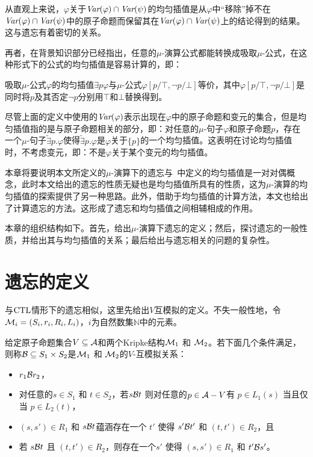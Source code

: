 从直观上来说，$\varphi$关于$\textit{Var}(\varphi) \cap \textit{Var}(\psi)$的均匀插值是从$\varphi$中“移除”掉不在$\textit{Var}(\varphi) \cap \textit{Var}(\psi)$中的原子命题而保留其在$\textit{Var}(\varphi) \cap \textit{Var}(\psi)$上的结论得到的结果。这与遗忘有着密切的关系。

再者，在背景知识部分已经指出，任意的$\mu$-演算公式都能转换成吸取$\mu$-公式，在这种形式下的公式的均匀插值是容易计算的，即：
\begin{theorem}
	吸取$\mu$-公式$\varphi$的均匀插值$\exists p \varphi$与$\mu$-公式$\varphi[p/\top, \neg p/ \bot]$等价，其中$\varphi[p/\top, \neg p/ \bot]$是同时将$p$及其否定$\neg p$分别用$\top$和$\bot$替换得到。
\end{theorem}



尽管上面的定义中使用的$\textit{Var}(\varphi)$表示出现在$\varphi$中的原子命题和变元的集合，但是均匀插值指的是与原子命题相关的部分，即：对任意的$\mu$-句子$\varphi$和原子命题$p$，存在一个$\mu$-句子$\widetilde{\exists} p. \varphi$使得$\widetilde{\exists} p. \varphi$是$\varphi$关于$\{p\}$的一个均匀插值。这表明在讨论均匀插值时，不考虑变元，即：不是$\varphi$关于某个变元的均匀插值。%

本章将要说明本文所定义的$\mu$-演算下的遗忘与~\cite{d2006modal}中定义的均匀插值是一对对偶概念，此时本文给出的遗忘的性质无疑也是均匀插值所具有的性质，这为$\mu$-演算的均匀插值的探索提供了另一种思路。此外，借助于均匀插值的计算方法，本文也给出了计算遗忘的方法。这形成了遗忘和均匀插值之间相辅相成的作用。

本章的组织结构如下。首先，给出$\mu$-演算下遗忘的定义；然后，探讨遗忘的一般性质，并给出其与均匀插值的关系；最后给出与遗忘相关的问题的复杂性。

\section{遗忘的定义}\label{sec:chapter06-system-model}
与$\textrm{CTL}$情形下的遗忘相似，这里先给出$V$互模拟的定义。不失一般性地，令${\cal M}_i = (S_i, r_i, R_i, L_i)$，$i$为自然数集$\mathbb{N}$中的元素。
\begin{definition}[$V$-互模拟]\label{def:VB}
	给定原子命题集合$V \subseteq {\cal A}$和两个Kripke结构${\cal M}_1$ 和 ${\cal M}_2$。若下面几个条件满足，则称${\cal B}\subseteq S_1 \times S_2$是${\cal M}_1$ 和 ${\cal M}_2$的$V$-互模拟关系：
	\begin{itemize}
		\item $r_1 {\cal B} r_2$，
		\item 对任意的$s\in S_1$ 和 $t\in S_2$，若$s {\cal B} t$ 则对任意的$p \in {\cal A}- V$有 $p \in L_1(s)$ 当且仅当 $p \in L_2(t)$，
		\item $(s, s')\in R_1$ 和 $s {\cal B} t$蕴涵存在一个 $t'$ 使得 $s' {\cal B} t'$ 和 $(t, t')\in R_2$，且
		\item 若 $s {\cal B} t$ 且 $(t, t')\in R_2$，则存在一个$s'$ 使得 $(s, s')\in R_1$ 和 $t' {\cal B} s'$。
	\end{itemize}
\end{definition}

